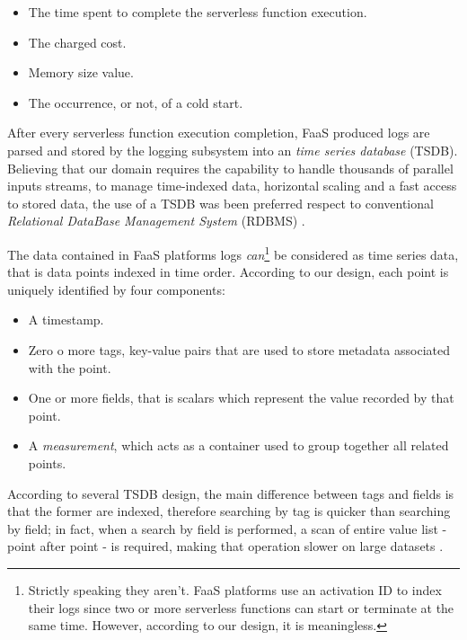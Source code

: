 \documentclass[12pt,a4paper]{report}
\begin{document}
\begin{itemize}
	\item The time spent to complete the serverless function execution.
	\item The charged cost.
	\item Memory size value.
	\item The occurrence, or not, of a cold start.
\end{itemize}

After every serverless function execution completion, FaaS produced logs are parsed and stored by the logging subsystem into an \textit{time series database} (TSDB). Believing that our domain requires the capability to handle thousands of parallel inputs streams, to manage time-indexed data, horizontal scaling and a fast access to stored data, the use of a TSDB was been preferred respect to conventional \textit{Relational DataBase Management System} (RDBMS) \cite{IOTTSDB}.  

The data contained in FaaS platforms logs \textit{can}\footnote{Strictly speaking they aren't. FaaS platforms use an activation ID to index their logs since two or more serverless functions can start or terminate at the same time. However, according to our design, it is meaningless.} be considered as time series data, that is data points indexed in time order. According to our design, each point is uniquely identified by four components:

\begin{itemize}
	\item A timestamp.
	
	\item Zero o more tags, key-value pairs that are used to store metadata associated with the point. 
	
	\item One or more fields, that is scalars which represent the value recorded by that point.
	
	\item A \textit{measurement}, which acts as a container used to group together all related points.
	
\end{itemize}

According to several TSDB design, the main difference between tags and fields is that the former are indexed, therefore searching by tag is quicker than searching by field; in fact, when a search by field is performed, a scan of entire value list - point after point - is required, making that operation slower on large datasets \cite{IOTTSDB}.
\end{document}
